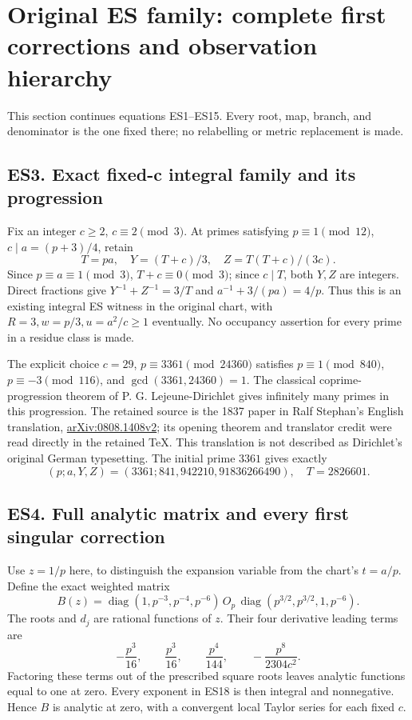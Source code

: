 \section{Original ES family: complete first corrections and observation hierarchy}\label{original-es-family-complete-first-corrections-and-observation-hierarchy}

This section continues equations ES1--ES15.  Every root, map, branch, and
denominator is the one fixed there; no relabelling or metric replacement is
made.

\subsection{ES3. Exact fixed-c integral family and its progression}\label{es3.-exact-fixed-c-integral-family-and-its-progression}

Fix an integer \(c\ge2\), \(c\equiv2\pmod3\). At primes satisfying \(p\equiv1\pmod{12}\), \(c\mid a=(p+3)/4\), retain \[
T=pa,\quad Y=(T+c)/3,\quad Z=T(T+c)/(3c).
\tag{ES16}
\] Since \(p\equiv a\equiv1\pmod3\), \(T+c\equiv0\pmod3\); since \(c\mid T\), both \(Y,Z\) are integers. Direct fractions give \(Y^{-1}+Z^{-1}=3/T\) and \(a^{-1}+3/(pa)=4/p\). Thus this is an existing integral ES witness in the original chart, with \(R=3,w=p/3,u=a^2/c\ge1\) eventually. No occupancy assertion for every prime in a residue class is made.

The explicit choice \(c=29\), \(p\equiv3361\pmod{24360}\) satisfies \(p\equiv1\pmod{840}\), \(p\equiv-3\pmod{116}\), and \(\gcd(3361,24360)=1\). The classical coprime-progression theorem of P. G. Lejeune-Dirichlet gives infinitely many primes in this progression. The retained source is the 1837 paper in Ralf Stephan's English translation, \href{https://arxiv.org/abs/0808.1408v2}{arXiv:0808.1408v2}; its opening theorem and translator credit were read directly in the retained TeX. This translation is not described as Dirichlet's original German typesetting. The initial prime \(3361\) gives exactly \[
(p;a,Y,Z)=(3361;841,942210,91836266490),\quad T=2826601.
\tag{ES17}
\]

\subsection{ES4. Full analytic matrix and every first singular correction}\label{es4.-full-analytic-matrix-and-every-first-singular-correction}

Use \(z=1/p\) here, to distinguish the expansion variable from the chart's \(t=a/p\). Define the exact weighted matrix \[
B(z)=\operatorname{diag}(1,p^{-3},p^{-4},p^{-6})\,O_p\,
\operatorname{diag}(p^{3/2},p^{3/2},1,p^{-6}).
\tag{ES18}
\] The roots and \(d_j\) are rational functions of \(z\). Their four derivative leading terms are
\[
-\frac{p^3}{16},\qquad \frac{p^3}{16},\qquad
\frac{p^4}{144},\qquad -\frac{p^8}{2304c^2}.
\]
Factoring these terms out of the prescribed square roots leaves analytic functions equal to one at zero. Every exponent in ES18 is then integral and nonnegative. Hence \(B\) is analytic at zero, with a convergent local Taylor series for each fixed \(c\).

